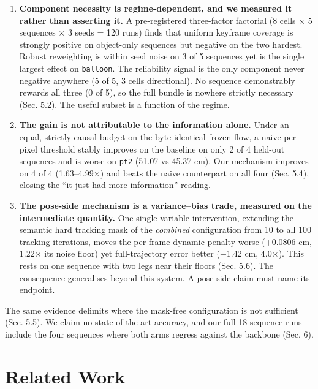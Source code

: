 \begin{enumerate}\setlength{\itemsep}{0pt}
\item \textbf{Component necessity is regime-dependent, and we measured it rather than asserting it.} A pre-registered three-factor factorial (8 cells $\times$ 5 sequences $\times$ 3 seeds = 120 runs) finds that uniform keyframe coverage is strongly positive on object-only sequences but negative on the two hardest. Robust reweighting is within seed noise on 3 of 5 sequences yet is the single largest effect on \texttt{balloon}. The reliability signal is the only component never negative anywhere (5 of 5, 3 cells directional). No sequence demonstrably rewards all three (0 of 5), so the full bundle is nowhere strictly necessary (Sec. 5.2). The useful subset is a function of the regime.

\item \textbf{The gain is not attributable to the information alone.} Under an equal, strictly causal budget on the byte-identical frozen flow, a naive per-pixel threshold stably improves on the baseline on only 2 of 4 held-out sequences and is worse on \texttt{pt2} (51.07 vs 45.37 cm). Our mechanism improves on 4 of 4 (1.63--4.99$\times$) and beats the naive counterpart on all four (Sec. 5.4), closing the ``it just had more information'' reading.

\item \textbf{The pose-side mechanism is a variance--bias trade, measured on the intermediate quantity.} One single-variable intervention, extending the semantic hard tracking mask of the \emph{combined} configuration from 10 to all 100 tracking iterations, moves the per-frame dynamic penalty worse (+0.0806 cm, 1.22$\times$ its noise floor) yet full-trajectory error better ($-$1.42 cm, 4.0$\times$). This rests on one sequence with two legs near their floors (Sec. 5.6). The consequence generalises beyond this system. A pose-side claim must name its endpoint.
\end{enumerate}


The same evidence delimits where the mask-free configuration is not sufficient (Sec. 5.5). We claim no state-of-the-art accuracy, and our full 18-sequence runs include the four sequences where both arms regress against the backbone (Sec. 6).




\section{Related Work}



